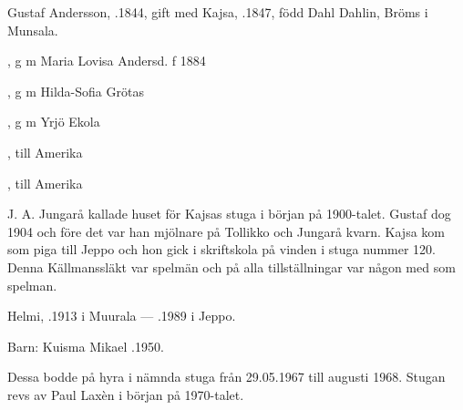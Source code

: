 Gustaf Andersson, .1844, gift med Kajsa, .1847, född Dahl Dahlin, Bröms i Munsala.
\begin{jhchildren}
  \item {}, g m Maria Lovisa Andersd. f 1884
  \item {}, g m Hilda-Sofia Grötas
  \item {}, g m Yrjö Ekola
  \item {}
  \item {}, till Amerika
  \item {}, till Amerika
  \item {}
\end{jhchildren}
J. A. Jungarå kallade huset för Kajsas stuga i början på 1900-talet. Gustaf dog 1904 och före det var han mjölnare på Tollikko och Jungarå kvarn. Kajsa kom som piga till Jeppo och hon gick i skriftskola på vinden i stuga nummer 120. Denna Källmanssläkt var spelmän och på alla tillställningar var någon med som spelman.





Helmi, .1913 i Muurala  ---  .1989 i Jeppo.

Barn: Kuisma Mikael .1950.

Dessa bodde på hyra i nämnda stuga från 29.05.1967 till augusti 1968. Stugan revs av Paul Laxèn i början på 1970-talet.



